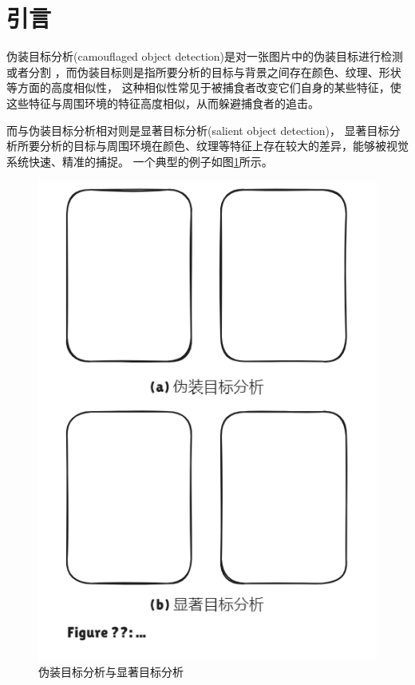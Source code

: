\documentclass[a4paper,12pt]{ctexart}
\begin{document}
\section{引言}

伪装目标分析(camouflaged object detection)是对一张图片中的伪装目标进行检测或者分割
，而伪装目标则是指所要分析的目标与背景之间存在颜色、纹理、形状等方面的高度相似性，
这种相似性常见于被捕食者改变它们自身的某些特征，使这些特征与周围环境的特征高度相似，从而躲避捕食者的追击。

而与伪装目标分析相对则是显著目标分析(salient object detection)，
显著目标分析所要分析的目标与周围环境在颜色、纹理等特征上存在较大的差异，能够被视觉系统快速、精准的捕捉。
一个典型的例子如图\ref{fig:camouflagedVSSalient}所示。

\begin{figure}[htbp]
    \centering
    \includegraphics[height=0.5\textheight]{figures/camouflagedVSSalient.png}
    \caption{伪装目标分析与显著目标分析}
    \label{fig:camouflagedVSSalient}
\end{figure}
\end{document}
